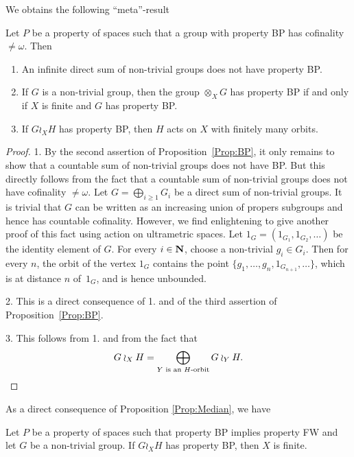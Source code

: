 We obtains the following ``meta''-result
\begin{lem}\label{lem:SumFA}
Let $P$ be a property of spaces such that a group with property BP has cofinality $\neq \omega$.
Then
\begin{enumerate}
\item
An infinite direct sum of non-trivial groups does not have property BP.
\item
If  $G$ is a non-trivial group, then 
the group $\otimes_X G$ has property BP if and only if $X$ is finite and $G$ has property BP.
\item
If $G\wr_XH$ has property BP, then $H$ acts on $X$ with finitely many orbits.
\end{enumerate}
\end{lem}
\begin{proof}
1. By the second assertion of Proposition~\ref{Prop:BP}, it only remains to show that a countable sum of non-trivial groups does not have BP.
But this directly follows from the fact that a countable sum of non-trivial groups does not have cofinality $\neq \omega$.
Let $G=\bigoplus_{i\geq 1} G_i$ be a direct sum of non-trivial groups.
It is trivial that $G$ can be written as an increasing union of propers subgroups and hence has countable cofinality.
However, we find enlightening to give another proof of this fact using action on ultrametric spaces.
Let $1_G=(1_{G_1},1_{G_2},\dots)$ be the identity element of $G$.
For every $i\in \mathbf{N}$, choose a non-trivial $g_i\in G_i$.
Then for every $n$, the orbit of the vertex $1_G$ contains the point $\{g_1,\dots, g_n,1_{G_{n+1}},\dots\}$, which is at distance $n$ of~$1_G$, and is hence unbounded.

2. This is a direct consequence of 1. and of the third assertion of Proposition~\ref{Prop:BP}.

3. This follows from 1. and from the fact that 
\[G\wr_XH=\bigoplus_{Y \textnormal{ is an $H$-orbit}}G\wr_YH.\]
\end{proof}
As a direct consequence of  Proposition \ref{Prop:Median}, we have
\begin{lem}\label{Lemma:Tree}
Let $P$ be a property of spaces such that property BP implies property FW and let $G$ be a non-trivial group.
If $G\wr_X H$ has property BP, then $X$ is finite.
\end{lem}
